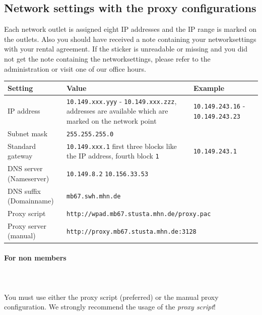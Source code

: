 \documentclass[a4paper,12pt]{scrartcl}
\begin{document}
\subsection*{Network settings with the proxy configurations}
Each network outlet is assigned eight IP addresses and the IP range is marked on the outlets. Also you should have received a note containing your networksettings with your rental agreement. If the sticker is unreadable or missing and you did not get the note containing the networksettings, please refer to the administration or visit one of our office hours.

\begin{center}
  \begin{tabularx}{\linewidth}{|lXp{.2\linewidth}|}
    \hline
    Setting & Value & Example \\
    \hline \hline
    IP address & \nolinkurl{10.149.xxx.yyy} - \nolinkurl{10.149.xxx.zzz}, \newline 8 addresses are available which are marked on the network point & \nolinkurl{10.149.243.16} - \nolinkurl{10.149.243.23} \\
    \hline
    Subnet mask & \nolinkurl{255.255.255.0} & \\
    \hline
    Standard gateway & \nolinkurl{10.149.xxx.1} \newline first three blocks like the IP address, fourth block \nolinkurl{1} & \nolinkurl{10.149.243.1} \\
    \hline
    DNS server (Nameserver) & \nolinkurl{10.149.8.2} \newline \nolinkurl{10.156.33.53} & \\
    \hline
    DNS suffix (Domainname) & \nolinkurl{mb67.swh.mhn.de} & \\
    \hline
    Proxy script & \multicolumn{2}{l|}{\nolinkurl{http://wpad.mb67.stusta.mhn.de/proxy.pac}} \\
    \hline
    Proxy server (manual) & \multicolumn{2}{l|}{\nolinkurl{http://proxy.mb67.stusta.mhn.de:3128}} \\
    \hline
  \end{tabularx}
\end{center}

\newpage

\paragraph*{For non members}~\\
\\
You must use either the proxy script (preferred) or the manual proxy configuration. We strongly recommend the usage of the \emph{proxy script}!
\end{document}

